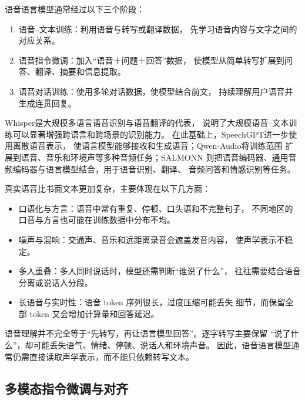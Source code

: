 语音语言模型通常经过以下三个阶段：

\begin{enumerate}
  \item 语音--文本训练：利用语音与转写或翻译数据，
  先学习语音内容与文字之间的对应关系。

  \item 语音指令微调：加入“语音＋问题＋回答”数据，
  使模型从简单转写扩展到问答、翻译、摘要和信息提取。

  \item 语音对话训练：使用多轮对话数据，使模型结合前文，
  持续理解用户语音并生成连贯回复。
\end{enumerate}

Whisper\cite{whisper}是大规模多语言语音识别与语音翻译的代表，
说明了大规模语音--文本训练可以显著增强跨语言和跨场景的识别能力。
在此基础上，SpeechGPT\cite{speechgpt}进一步使用离散语音表示，
使语言模型能够接收和生成语音；Qwen-Audio\cite{qwenaudio}将训练范围
扩展到语音、音乐和环境声等多种音频任务；SALMONN\cite{salmonn}
则把语音编码器、通用音频编码器与语言模型结合，用于语音识别、翻译、
音频问答和情感识别等任务。



真实语音比书面文本更加复杂，主要体现在以下几方面：

\begin{itemize}
  \item 口语化与方言：语音中常有重复、停顿、口头语和不完整句子，
  不同地区的口音与方言也可能在训练数据中分布不均。
  \item 噪声与混响：交通声、音乐和远距离录音会遮盖发音内容，
  使声学表示不稳定。
  \item 多人重叠：多人同时说话时，模型还需判断“谁说了什么”，
  往往需要结合语音分离或说话人分段。
  \item 长语音与实时性：语音 token 序列很长，过度压缩可能丢失
  细节，而保留全部 token 又会增加计算量和回答延迟。
\end{itemize}

\begin{importantnote}
  语音理解并不完全等于“先转写，再让语言模型回答”。逐字转写主要保留
  “说了什么”，却可能丢失语气、情绪、停顿、说话人和环境声音。
  因此，语音语言模型通常仍需直接读取声学表示，而不能只依赖转写文本。
\end{importantnote}

\subsection{多模态指令微调与对齐}
\label{sub:instruct}


